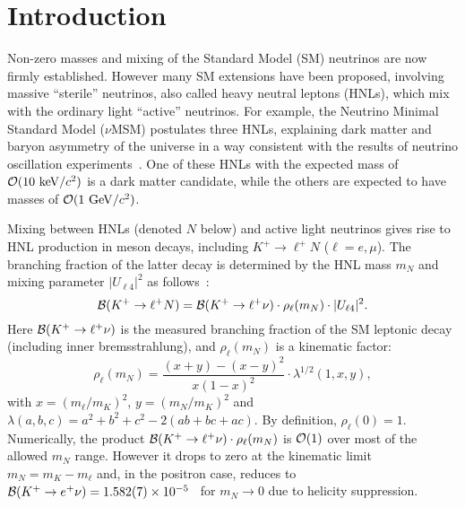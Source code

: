 \documentclass[11pt]{article}
\begin{document}

\section*{Introduction}

Non-zero masses and mixing of the Standard Model (SM) neutrinos are now firmly established. However many SM extensions have been proposed, involving massive ``sterile'' neutrinos, also called heavy neutral leptons (HNLs), which mix with the ordinary light ``active'' neutrinos. For example, the Neutrino Minimal Standard Model ($\nu$MSM) postulates three HNLs, explaining dark matter and baryon asymmetry of the universe in a way consistent with the results of neutrino oscillation experiments~\cite{nuMSM}. One of these HNLs with the expected mass of ${\cal O}(10~{\rm keV}/c^2)$ is a dark matter candidate, while the others are expected to have masses of ${\cal O}(1~{\rm GeV}/c^2)$.

Mixing between HNLs (denoted $N$ below) and active light neutrinos gives rise to HNL production in meson decays, including $K^+\to\ell^+N$ ($\ell=e,\mu$). The branching fraction of the latter decay is determined by the HNL mass $m_N$ and mixing parameter $|U_{\ell 4}|^2$ as follows~\cite{sh80,sh81}:
\begin{equation}
{\cal B}(K^+\to\ell^+ N) = {\cal B}(K^+\to\ell^+\nu) \cdot \rho_\ell(m_N) \cdot |U_{\ell 4}|^2.
\label{eq:main}
\end{equation}
Here ${\cal B}(K^+\to\ell^+\nu)$ is the measured branching fraction of the SM leptonic decay (including inner bremsstrahlung), and $\rho_\ell(m_N)$ is a kinematic factor:
\begin{displaymath}
\rho_\ell(m_N) = \frac {(x+y)-(x-y)^2} {x(1-x)^2} \cdot \lambda^{1/2}(1,x,y),
\end{displaymath}
with $x=(m_\ell/m_K)^2$, $y=(m_N/m_K)^2$ and $\lambda(a,b,c)=a^2+b^2+c^2-2(ab+bc+ac)$. By definition, $\rho_\ell(0)=1$. Numerically, the product ${\cal B}(K^+\to\ell^+\nu) \cdot \rho_\ell(m_N)$ is ${\cal O}(1)$ over most of the allowed $m_N$ range. However it drops to zero at the kinematic limit $m_N=m_K-m_\ell$ and, in the positron case, reduces to ${\cal B}(K^+\to e^+\nu)=1.582(7)\times 10^{-5}$~\cite{pdg} for $m_N \to 0$ due to helicity suppression.

\end{document}
